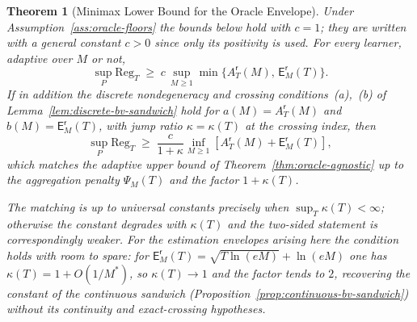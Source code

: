 \documentclass[12pt]{article}
\newtheorem{theorem}{Theorem}[section]
\theoremstyle{definition}
\newcommand{\Reg}{\mathrm{Reg}}
\newcommand{\Est}{\mathsf E}
\newcommand{\Aapp}{A_T}
\newcommand{\PsiAgg}{\Psi}
\begin{document}
\begin{theorem}[Minimax Lower Bound for the Oracle Envelope]
\label{thm:oracle-minimax-lower}
Under Assumption~\ref{ass:oracle-floors} the bounds below hold with $c=1$;
they are written with a general constant $c>0$ since only its positivity is
used.  For every learner, adaptive over $M$ or not,
\[
\sup_{P}\Reg_T
\;\ge\;
c\,
\sup_{M\ge1}
\min\bigl\{
\Aapp^{\mathsf r}(M),\,
\Est_M^{\mathsf r}(T)
\bigr\}.
\]
If in addition the discrete nondegeneracy and crossing conditions~(a),~(b) of
Lemma~\ref{lem:discrete-bv-sandwich} hold for
$a(M)=\Aapp^{\mathsf r}(M)$ and $b(M)=\Est_M^{\mathsf r}(T)$, with jump ratio
$\kappa=\kappa(T)$ at the crossing index, then
\[
\sup_{P}\Reg_T
\;\ge\;
\frac{c}{1+\kappa}
\inf_{M\ge1}
\left[
\Aapp^{\mathsf r}(M)+\Est_M^{\mathsf r}(T)
\right],
\]
which matches the adaptive upper bound of
Theorem~\ref{thm:oracle-agnostic} up to the aggregation penalty
$\PsiAgg_M(T)$ and the factor $1+\kappa(T)$.

The matching is up to \emph{universal} constants precisely when
$\sup_T\kappa(T)<\infty$; otherwise the constant degrades with $\kappa(T)$ and
the two-sided statement is correspondingly weaker.  For the estimation
envelopes arising here the condition holds with room to spare: for
$\Est_M^{\mathsf r}(T)=\sqrt{T\ln(eM)}+\ln(eM)$ one has
$\kappa(T)=1+O(1/M^\ast)$, so $\kappa(T)\to1$ and the factor tends to $2$,
recovering the constant of the continuous sandwich
(Proposition~\ref{prop:continuous-bv-sandwich}) without its continuity and
exact-crossing hypotheses.
\end{theorem}
\end{document}
